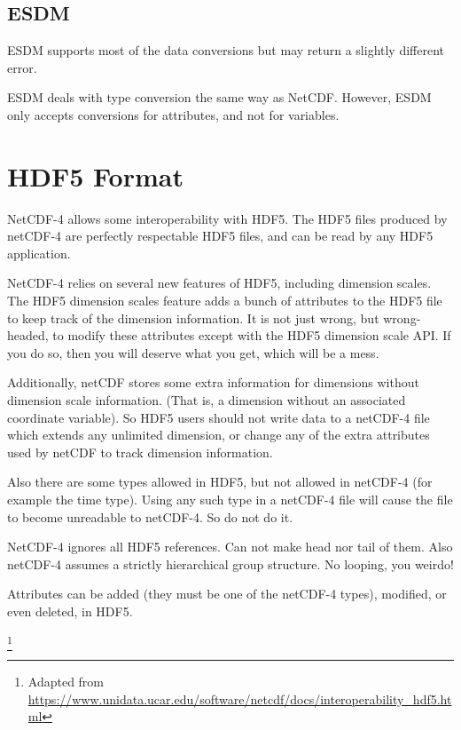 \subsection{ESDM}

ESDM supports most of the data conversions but may return a slightly different error.

ESDM deals with type conversion the same way as NetCDF.
However, ESDM only accepts conversions for attributes, and not for variables.




\section{HDF5 Format}

{\itshape

NetCDF-4 allows some interoperability with HDF5.
The HDF5 files produced by netCDF-4 are perfectly respectable HDF5 files, and can be read by any HDF5 application.

NetCDF-4 relies on several new features of HDF5, including dimension scales.
The HDF5 dimension scales feature adds a bunch of attributes to the HDF5 file to keep track of the dimension information.
It is not just wrong, but wrong-headed, to modify these attributes except with the HDF5 dimension scale API.
If you do so, then you will deserve what you get, which will be a mess.

Additionally, netCDF stores some extra information for dimensions without dimension scale information.
(That is, a dimension without an associated coordinate variable).
So HDF5 users should not write data to a netCDF-4 file which extends any unlimited dimension, or change any of the extra attributes used by netCDF to track dimension information.

Also there are some types allowed in HDF5, but not allowed in netCDF-4 (for example the time type).
Using any such type in a netCDF-4 file will cause the file to become unreadable to netCDF-4.
So do not do it.

NetCDF-4 ignores all HDF5 references.
Can not make head nor tail of them.
Also netCDF-4 assumes a strictly hierarchical group structure.
No looping, you weirdo!

Attributes can be added (they must be one of the netCDF-4 types), modified, or even deleted, in HDF5.
}\footnote{Adapted from \url{https://www.unidata.ucar.edu/software/netcdf/docs/interoperability_hdf5.html}}

